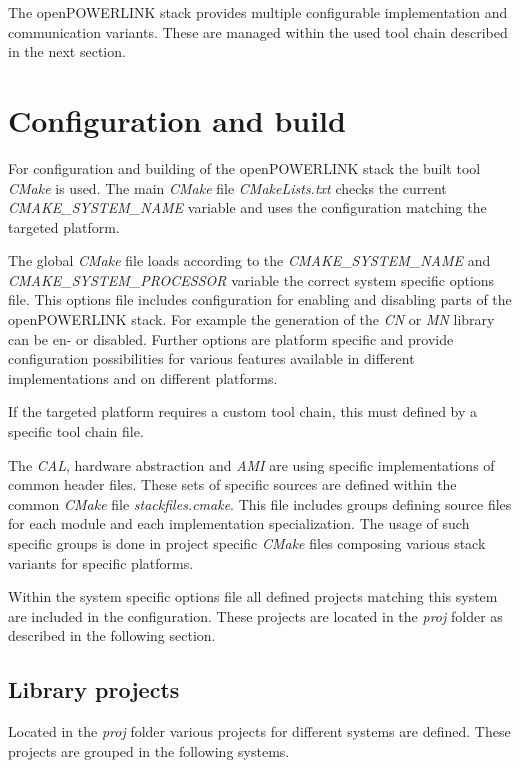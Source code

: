 The openPOWERLINK stack provides multiple configurable implementation and communication variants.
These are managed within the used tool chain described in the next section.

\section{Configuration and build}
\label{sec:oplk_build}
For configuration and building of the openPOWERLINK stack the built tool \emph{CMake} is used.
The main \emph{CMake} file \emph{CMakeLists.txt} checks the current \emph{CMAKE\_SYSTEM\_NAME} variable and uses the configuration matching the targeted platform.

\begin{sloppypar}
The global \emph{CMake} file loads according to the \emph{CMAKE\_SYSTEM\_NAME} and \emph{CMAKE\_SYSTEM\_PROCESSOR} variable the correct system specific options file.
This options file includes configuration for enabling and disabling parts of the openPOWERLINK stack.
For example the generation of the \emph{CN} or \emph{MN} library can be en- or disabled.
Further options are platform specific and provide configuration possibilities for various features available in different implementations and on different platforms.
\end{sloppypar}

If the targeted platform requires a custom tool chain, this must defined by a specific tool chain file.

The \emph{CAL}, hardware abstraction and \emph{AMI} are using specific implementations of common header files.
These sets of specific sources are defined within the common \emph{CMake} file \emph{stackfiles.cmake}.
This file includes groups defining source files for each module and each implementation specialization.
The usage of such specific groups is done in project specific \emph{CMake} files composing various stack variants for specific platforms. \cite[Building openPOWERLINK]{openpowerlink_doc}

Within the system specific options file all defined projects matching this system are included in the configuration.
These projects are located in the \emph{proj} folder as described in the following section.

\subsection{Library projects}
\label{sec:oplk_structure_proj}
Located in the \emph{proj} folder various projects for different systems are defined.
These projects are grouped in the following systems.

